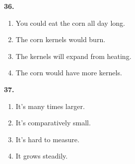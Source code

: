 \documentclass[12pt]{article}
\begin{document}
\par
\vspace{0.25\baselineskip}
\noindent\textbf{36.}
\begin{enumerate}[label=(\Alph*),leftmargin=*,itemsep=0.2em]
\item You could eat the corn all day long.
\item The corn kernels would burn.
\item The kernels will expand from heating.
\item The corn would have more kernels.
\end{enumerate}
\par
\vspace{0.25\baselineskip}
\noindent\textbf{37.}
\begin{enumerate}[label=(\Alph*),leftmargin=*,itemsep=0.2em]
\item It's many times larger.
\item It's comparatively small.
\item It's hard to measure.
\item It grows steadily.
\end{enumerate}
\par
\vspace{0.25\baselineskip}
\end{document}
